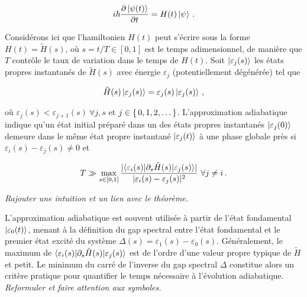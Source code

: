 
\begin{align*}
   i \hbar \frac{\partial \ket{\psi(t)}}{\partial t} = H(t) \ket{\psi} \,.
\end{align*}

Considérons ici que l'hamiltonien $H(t)$ peut s'écrire sous la forme $H(t) = \tilde{H}(s)$, où $s=t/T \in [0,1]$ est le temps adimensionnel, de manière que $T$ contrôle le taux de variation dans le temps de $H(t)$. Soit $\ket{\varepsilon_{j} (s)}$ les états propres instantanés de $\tilde{H}(s)$ avec énergie $\varepsilon_{j}$ (potentiellement dégénérée) tel que

\begin{equation}
   \tilde{H}(s) \ket{\varepsilon_{j}(s)} = \varepsilon_{j}(s) \ket{\varepsilon_{j}(s)} \,,
\end{equation}

où $\varepsilon_{j}(s) < \varepsilon_{j+1}(s) \ \forall j,s$ et $j \in \set{ 0, 1, 2, \dots }$. L'approximation adiabatique indique qu'un état initial préparé dans un des états propres instantanés $\ket{\varepsilon_{j}(0)}$ demeure dans le même état propre instantané $\ket{\varepsilon_{j}(t)}$ à une phase globale près si $\varepsilon_{i}(s) - \varepsilon_{j}(s) \neq  0$ et

\begin{equation}
    T \gg \max_{s \in [0,1]} \frac{\lvert \braket{ \varepsilon_{i}(s) | \partial_{s} \tilde{H}(s) | \varepsilon_{j}(s) } \rvert }{\lvert \varepsilon_{i}(s) - \varepsilon_{j}(s) \rvert^{2} } \ \forall j \neq i \,.
\end{equation}



\textcolor{mydarkred}{\textit{Rajouter une intuition et un lien avec le théorème.}}

L'approximation adiabatique est souvent utilisée à partir de l'état fondamental $\ket{\varepsilon_{0}(t)}$, menant à la définition du gap spectral entre l'état fondamental et le premier état excité du système $\Delta(s) = \varepsilon_{1}(s) - \varepsilon_{0}(s)$. Généralement, le maximum de $\braket{ \varepsilon_{i}(s) | \partial_{s} \tilde{H}(s) | \varepsilon_{j}(s)}$ est de l'ordre d'une valeur propre typique de $\tilde{H}$ et petit. Le minimum du carré de l'inverse du gap spectral $\Delta$ constitue alors un critère pratique pour quantifier le temps nécessaire à l'évolution adiabatique. \textcolor{mydarkred}{\textit{Reformuler et faire attention aux symboles.}}


